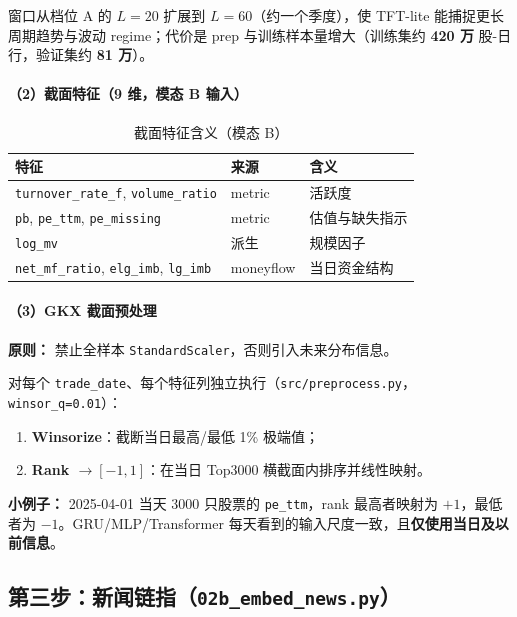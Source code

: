 \documentclass[UTF8,a4paper,12pt]{ctexart}
\begin{document}
窗口从档位 A 的 $L=20$ 扩展到 \textbf{$L=60$}（约一个季度），使 TFT-lite 能捕捉更长周期趋势与波动 regime；代价是 prep 与训练样本量增大（训练集约 \textbf{420 万} 股-日行，验证集约 \textbf{81 万}）。

\paragraph{（2）截面特征（9 维，模态 B 输入）}

\begin{table}[H]
\centering
\caption{截面特征含义（模态 B）}
\label{tab:tab-feat}
\small
\begin{tabular}{llp{6cm}}
\toprule
\textbf{特征} & \textbf{来源} & \textbf{含义} \\
\midrule
\texttt{turnover\_rate\_f}, \texttt{volume\_ratio} & metric & 活跃度 \\
\texttt{pb}, \texttt{pe\_ttm}, \texttt{pe\_missing} & metric & 估值与缺失指示 \\
\texttt{log\_mv}           & 派生 & 规模因子 \\
\texttt{net\_mf\_ratio}, \texttt{elg\_imb}, \texttt{lg\_imb} & moneyflow & 当日资金结构 \\
\bottomrule
\end{tabular}
\end{table}

\paragraph{（3）GKX 截面预处理}

\textbf{原则：} 禁止全样本 \texttt{StandardScaler}，否则引入未来分布信息。

对每个 \texttt{trade\_date}、每个特征列独立执行（\texttt{src/preprocess.py}，\texttt{winsor\_q=0.01}）：
\begin{enumerate}[leftmargin=2em]
  \item \textbf{Winsorize}：截断当日最高/最低 1\% 极端值；
  \item \textbf{Rank $\to [-1,1]$}：在当日 Top3000 横截面内排序并线性映射。
\end{enumerate}
\textbf{小例子：} 2025-04-01 当天 3000 只股票的 \texttt{pe\_ttm}，rank 最高者映射为 $+1$，最低者为 $-1$。GRU/MLP/Transformer 每天看到的输入尺度一致，且\textbf{仅使用当日及以前信息}。

\subsection{第三步：新闻链指（\texttt{02b\_embed\_news.py}）}
\end{document}

